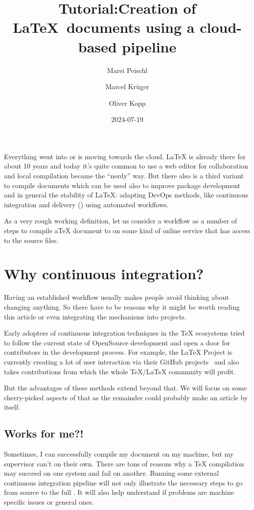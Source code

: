 \documentclass[final]{ltugboat}
\title[TUG2024: LaTeX CI/CD]{Tutorial:\newline Creation of \LaTeX\ documents using a cloud-based pipeline}
\date{2024-07-19}
\author{Marei Peischl}
\author{Marcel Krüger}
\author{Oliver Kopp}
\begin{document}
\maketitle

Everything went into or is moving towards the cloud.
\LaTeX{} is already there for about 10 years and today it's quite common to use a web editor for collaboration and local compilation became the \enquote{nerdy} way.
But there also is a third variant to compile documents which can be used also to improve package development and in general the stability of \LaTeX:
adapting DevOps methods, like continuous integration and delivery () using automated workflows.

As a very rough working definition, let us consider a  workflow as a number of steps to compile a\TeX{} document to  on some kind of online service that has access to the source files.

\section{Why continuous integration?}
Having an established workflow usually makes people avoid thinking about changing anything.
So there have to be reasons why it might be worth reading this article or even integrating the mechanisms into projects.

Early adopters of continuous integration techniques in the \TeX{} ecosystems tried to follow the current state of OpenSource development and open a door for contributors in the development process.
For example, the \LaTeX{} Project is currently creating a lot of user interaction via their GitHub projects~\cite{latex3-github} and also takes contributions from which the whole \TeX/\LaTeX{} community will profit.

But the advantages of these methods extend beyond that. We will focus on some cherry-picked aspects of that as the remainder could probably make an article by itself.

\subsection{Works for me?!}
Sometimes, I can successfully compile my document on my machine, but my supervisor can't on their own.
There are tons of reasons why a \TeX{} compilation may succeed on one system and fail on another.
Running some external continuous integration pipeline will not only illustrate the necessary steps to go from source to the full .
It will also help understand if problems are machine specific issues or general ones.
\end{document}
